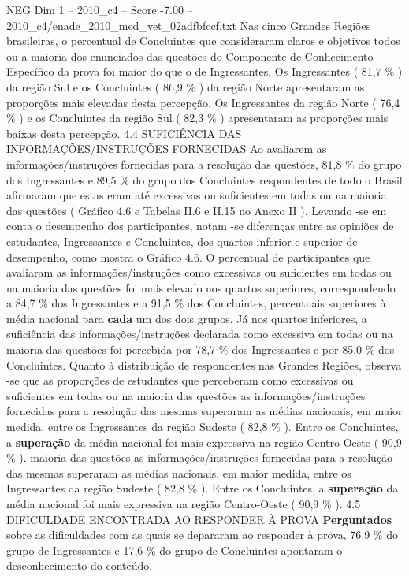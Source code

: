 \begin{textsample}{NEG Dim 1 – 2010\_c4 – Score -7.00 – 2010\_c4/enade\_2010\_med\_vet\_02adfbfccf.txt}
Nas cinco Grandes Regiões brasileiras, o percentual de Concluintes que consideraram claros e objetivos todos ou a maioria dos enunciados das questões do Componente de Conhecimento Específico da prova foi maior do que o de Ingressantes.
Os Ingressantes ( 81,7 \% ) da região Sul e os Concluintes ( 86,9 \% ) da região Norte apresentaram as proporções mais elevadas desta percepção.
Os Ingressantes da região Norte ( 76,4 \% ) e os Concluintes da região Sul ( 82,3 \% ) apresentaram as proporções mais baixas desta percepção. 4.4 SUFICIÊNCIA DAS INFORMAÇÕES/INSTRUÇÕES FORNECIDAS Ao avaliarem as informações/instruções fornecidas para a resolução das questões, 81,8 \% do grupo dos Ingressantes e 89,5 \% do grupo dos Concluintes respondentes de todo o Brasil afirmaram que estas eram até excessivas ou suficientes em todas ou na maioria das questões ( Gráfico 4.6 e Tabelas II.6 e II.15 no Anexo II ).
Levando -se em conta o desempenho dos participantes, notam -se diferenças entre as opiniões de estudantes, Ingressantes e Concluintes, dos quartos inferior e superior de desempenho, como mostra o Gráfico 4.6.
O percentual de participantes que avaliaram as informações/instruções como excessivas ou suficientes em todas ou na maioria das questões foi mais elevado nos quartos superiores, correspondendo a 84,7 \% dos Ingressantes e a 91,5 \% dos Concluintes, percentuais superiores à média nacional para \textbf{cada} um dos dois grupos.
Já nos quartos inferiores, a suficiência das informações/instruções declarada como excessiva em todas ou na maioria das questões foi percebida por 78,7 \% dos Ingressantes e por 85,0 \% dos Concluintes.
Quanto à distribuição de respondentes nas Grandes Regiões, observa -se que as proporções de estudantes que perceberam como excessivas ou suficientes em todas ou na maioria das questões as informações/instruções fornecidas para a resolução das mesmas superaram as médias nacionais, em maior medida, entre os Ingressantes da região Sudeste ( 82,8 \% ).
Entre os Concluintes, a \textbf{superação} da média nacional foi mais expressiva na região Centro-Oeste ( 90,9 \% ). maioria das questões as informações/instruções fornecidas para a resolução das mesmas superaram as médias nacionais, em maior medida, entre os Ingressantes da região Sudeste ( 82,8 \% ).
Entre os Concluintes, a \textbf{superação} da média nacional foi mais expressiva na região Centro-Oeste ( 90,9 \% ). 4.5 DIFICULDADE ENCONTRADA AO RESPONDER À PROVA \textbf{Perguntados} sobre as dificuldades com as quais se depararam ao responder à prova, 76,9 \% do grupo de Ingressantes e 17,6 \% do grupo de Concluintes apontaram o desconhecimento do conteúdo.

\end{textsample}
